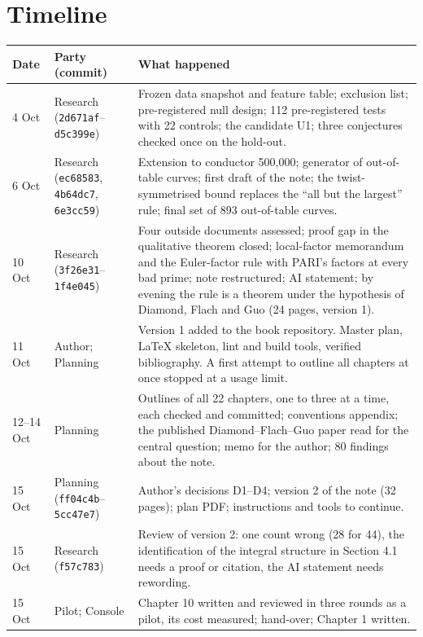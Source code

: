 \documentclass[11pt,a4paper]{article}
\begin{document}
\section{Timeline}
\begin{center}\small
\begin{longtable}{@{}p{15mm}p{24mm}p{110mm}@{}}
\toprule
Date & Party (commit) & What happened\\
\midrule\endhead
4 Oct & Research (\texttt{2d671af}--\texttt{d5c399e}) & Frozen data snapshot and feature table; exclusion list; pre-registered null design; 112 pre-registered tests with 22 controls; the candidate U1; three conjectures checked once on the hold-out.\\
6 Oct & Research (\texttt{ec68583}, \texttt{4b64dc7}, \texttt{6e3cc59}) & Extension to conductor 500,000; generator of out-of-table curves; first draft of the note; the twist-symmetrised bound replaces the ``all but the largest'' rule; final set of 893 out-of-table curves.\\
10 Oct & Research (\texttt{3f26e31}--\texttt{1f4e045}) & Four outside documents assessed; proof gap in the qualitative theorem closed; local-factor memorandum and the Euler-factor rule with PARI's factors at every bad prime; note restructured; AI statement; by evening the rule is a theorem under the hypothesis of Diamond, Flach and Guo (24 pages, version 1).\\
11 Oct & Author; Planning & Version 1 added to the book repository. Master plan, LaTeX skeleton, lint and build tools, verified bibliography. A first attempt to outline all chapters at once stopped at a usage limit.\\
12--14 Oct & Planning & Outlines of all 22 chapters, one to three at a time, each checked and committed; conventions appendix; the published Diamond--Flach--Guo paper read for the central question; memo for the author; 80 findings about the note.\\
15 Oct & Planning (\texttt{ff04c4b}--\texttt{5cc47e7}) & Author's decisions D1--D4; version 2 of the note (32 pages); plan PDF; instructions and tools to continue.\\
15 Oct & Research (\texttt{f57c783}) & Review of version 2: one count wrong (28 for 44), the identification of the integral structure in Section 4.1 needs a proof or citation, the AI statement needs rewording.\\
15 Oct & Pilot; Console & Chapter 10 written and reviewed in three rounds as a pilot, its cost measured; hand-over; Chapter 1 written.\\

\end{longtable}
\end{center}
\end{document}
